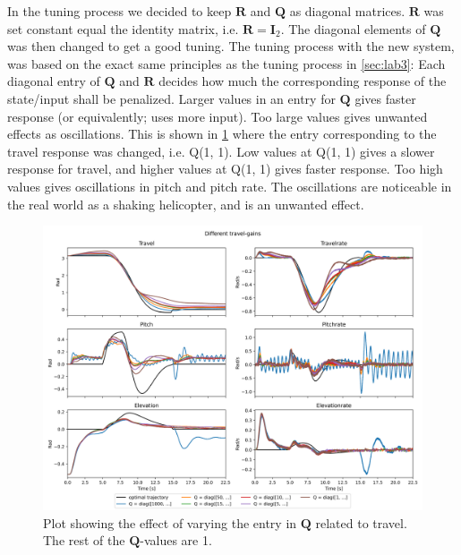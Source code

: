\documentclass[../main.tex]{subfiles}
\begin{document}
In the tuning process we decided to keep $ \bm R $ and $ \bm Q $ as diagonal matrices. $ \bm R $ was set constant equal the identity matrix, i.e. $\bm R = \bm I_2$. The diagonal elements of $ \bm Q $ was then changed to get a good tuning. 
The tuning process with the new system, was based on the exact same principles as the tuning process in \cref{sec:lab3}: Each diagonal entry of $ \bm Q $ and $ \bm R $ decides how much the corresponding response of the state/input shall be penalized. Larger values in an entry for $ \bm Q $ gives faster response (or equivalently; uses more input). Too large values gives unwanted effects as oscillations. 
This is shown in \cref{fig:lab4_diff_Q_values} where the entry corresponding to the travel response was changed, i.e. Q(1, 1). Low values at Q(1, 1) gives a slower response for travel, and higher values at Q(1, 1) gives faster response. Too high values gives oscillations in pitch and pitch rate. The oscillations are noticeable in the real world as a shaking helicopter, and is an unwanted effect. 
\begin{figure}[h]
	\centering
	\includegraphics[width=\linewidth]{figures/LAB4_travel_gains.png}
	\caption{Plot showing the effect of varying the entry in $ \bm Q $ related to travel. The rest of the $ \bm Q $-values are 1.}
	\label{fig:lab4_diff_Q_values}
\end{figure}
\end{document}
